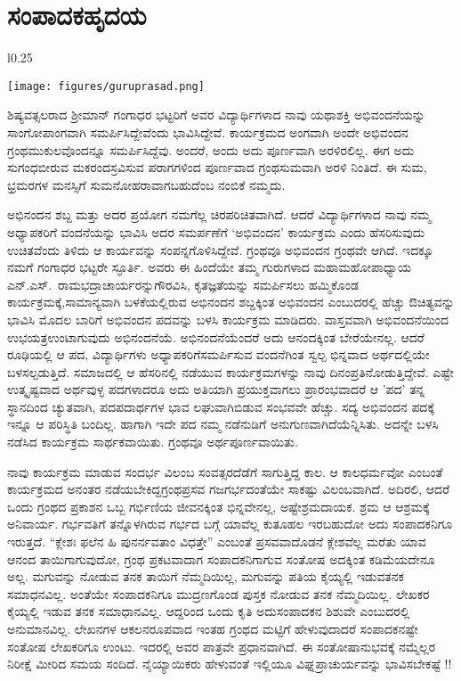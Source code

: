 {\fontsize{14}{16}\selectfont

\chapter{ಸಂಪಾದಕ\enginline{--}ಹೃದಯ}

\begin{wrapfigure}{l}{0.25\textwidth}
\centerline{\texttt{[image: figures/guruprasad.png]}}
\end{wrapfigure}
ಶಿಷ್ಯವತ್ಸಲರಾದ ಶ್ರೀಮಾನ್ ಗಂಗಾಧರ ಭಟ್ಟರಿಗೆ ಅವರ ವಿದ್ಯಾರ್ಥಿಗಳಾದ ನಾವು ಯಥಾಶಕ್ತಿ ಅಭಿವಂದನೆಯನ್ನು ಸಾಂಗೋಪಾಂಗವಾಗಿ ಸಮರ್ಪಿಸಿದ್ದೇವೆಂದು ಭಾವಿಸಿದ್ದೇವೆ. ಕಾರ್ಯಕ್ರಮದ ಅಂಗವಾಗಿ ಅಂದೇ ಅಭಿವಂದನ ಗ್ರಂಥ\-ಮುಕುಲವೊಂದನ್ನೂ ಸಮರ್ಪಿಸಿದ್ದೆವು. ಅಂದರೆ, ಅಂದು ಅದು ಪೂರ್ಣವಾಗಿ ಅರಳಿರಲಿಲ್ಲ. ಈಗ ಅದು ಸುಗಂಧ\break ಬೀರುವ ಮಕರಂದಸ್ರವಿಸುವ ಪರಾಗಗಳಿಂದ ಪೂರ್ಣವಾದ ಗ್ರಂಥಸುಮವಾಗಿ ಅರಳಿ ನಿಂತಿದೆ. ಈ ಸುಮ, ಭ್ರಮರಗಳ ಮನಸ್ಸಿಗೆ ಸುಮನೋಹರಾವಾಗಬಹುದೆಂಬ ನಂಬಿಕೆ ನಮ್ಮದು.

ಅಭಿನಂದನ ಶಬ್ದ ಮತ್ತು ಅದರ ಪ್ರಯೋಗ ನಮಗೆಲ್ಲ ಚಿರಪರಿಚಿತವಾಗಿದೆ. ಆದರೆ ವಿದ್ಯಾರ್ಥಿಗಳಾದ ನಾವು ನಮ್ಮ ಅಧ್ಯಾಪಕರಿಗೆ ವಂದನೆಯನ್ನು ಭಾವಿಸಿ ಅದರ ಸಮರ್ಪಣೆಗೆ ‘ಅಭಿವಂದನ’ ಕಾರ್ಯಕ್ರಮ ಎಂದು ಹೆಸರಿಸುವುದು ಉಚಿತವೆಂದು ತಿಳಿದು ಆ ಕಾರ್ಯವನ್ನು ಸಂಪನ್ನಗೊಳಿಸಿದ್ದೇವೆ. ಗ್ರಂಥವೂ ಅಭಿವಂದನ ಗ್ರಂಥವೇ ಆಗಿದೆ. ಇದಕ್ಕೂ ನಮಗೆ ಗಂಗಾಧರ ಭಟ್ಟರೇ ಸ್ಫೂರ್ತಿ. ಅವರು ಈ ಹಿಂದೆಯೇ ತಮ್ಮ ಗುರುಗಳಾದ ಮಹಾಮಹೋಪಾಧ್ಯಾಯ ಎನ್.ಎಸ್.\ ರಾಮಭದ್ರಾಚಾರ್ಯರನ್ನು\break ಗೌರವಿಸಿ, ಕೃತಜ್ಞತೆಯನ್ನು ಸಮರ್ಪಿಸಲು ಹಮ್ಮಿಕೊಂಡ ಕಾರ್ಯಕ್ರಮಕ್ಕೆ,\break ಸಾಮಾನ್ಯವಾಗಿ ಬಳಕೆಯಲ್ಲಿರುವ ಅಭಿನಂದನ ಶಬ್ದಕ್ಕಿಂತ ಅಭಿವಂದನ ಎಂಬುದರಲ್ಲಿ ಹೆಚ್ಚು ಔಚಿತ್ಯವನ್ನು ಭಾವಿಸಿ ಮೊದಲ ಬಾರಿಗೆ ಅಭಿವಂದನ ಪದವನ್ನು ಬಳಸಿ ಕಾರ್ಯಕ್ರಮ ಮಾಡಿದರು. ವಾಸ್ತವವಾಗಿ ಅಭಿವಂದನೆಯಿಂದ ಉಭಯತ್ರ\break ಉಂಟಾಗುವುದು ಅಭಿನಂದನೆಯೆ. ಅಭಿನಂದನೆಯೆಂದರೆ ಅದು ಆನಂದಕ್ಕಿಂತ ಬೇರೆಯೇನಲ್ಲ. ಆದರೆ ರೂಢಿಯಲ್ಲಿ ಆ ಪದ, ವಿದ್ಯಾರ್ಥಿಗಳು ಅಧ್ಯಾಪಕರಿಗೆ\break ಸಮರ್ಪಿಸುವ ವಂದನೆಗಿಂತ ಸ್ವಲ್ಪ ಭಿನ್ನವಾದ ಅರ್ಥದಲ್ಲಿಯೇ ಬಳಸಲ್ಪಡುತ್ತಿದೆ. ಸಮಾಜದಲ್ಲಿ ಆ ಹೆಸರಿನಲ್ಲಿ ನಡೆಯುವ ಕಾರ್ಯಕ್ರಮಗಳನ್ನು ನಾವು ದಿನಂಪ್ರತಿ\break ನೋಡುತ್ತಿದ್ದೇವೆ. ಎಷ್ಟೇ ಉತ್ಕೃಷ್ಟವಾದ ಅರ್ಥವುಳ್ಳ ಪದಗಳಾದರೂ ಅದು ಅತಿಯಾಗಿ ಪ್ರಯುಕ್ತವಾಗಲು ಪ್ರಾರಂಭವಾದರೆ ಆ ’ಪದ’ ತನ್ನ ಸ್ಥಾನದಿಂದ ಚ್ಯುತವಾಗಿ, ಪದ\enginline{-}ಪದಾರ್ಥಗಳ ಭಾವ ಲಘುವಾಗಿಬಿಡುವ ಸಂಭವವೇ ಹೆಚ್ಚು. ಸದ್ಯ ಅಭಿವಂದನ ಪದಕ್ಕೆ ಇನ್ನೂ ಆ ಪರಿಸ್ಥಿತಿ ಬಂದಿಲ್ಲ. ಹಾಗಾಗಿ ಇದೇ ಪದ ನಮ್ಮ ನಡೆನುಡಿಗೆ ಅನುಗುಣವಾಗಿದೆಯೆನ್ನಿಸಿತು. ಅದನ್ನೇ ಬಳಸಿ ನಡೆಸಿದ ಕಾರ್ಯಕ್ರಮ ಸಾರ್ಥಕವಾಯಿತು. ಗ್ರಂಥವೂ ಅರ್ಥಪೂರ್ಣವಾಯಿತು.

ನಾವು ಕಾರ್ಯಕ್ರಮ ಮಾಡುವ ಸಂದರ್ಭ ವಿಲಂಬ ಸಂವತ್ಸರದೆಡೆಗೆ \hbox{ಸಾಗುತ್ತಿದ್ದ} ಕಾಲ.  ಆ ಕಾಲಧರ್ಮವೋ ಎಂಬಂತೆ ಕಾರ್ಯಕ್ರಮದ ಅನಂತರ ನಡೆಯಬೇಕಿದ್ದ\break ಗ್ರಂಥಪ್ರಸವ ಗಜಗರ್ಭದಂತೆಯೇ ಸಾಕಷ್ಟು ವಿಲಂಬವಾಗಿದೆ. ಅದಿರಲಿ, ಆದರೆ ಒಂದು ಗ್ರಂಥದ ಪ್ರಕಾಶನ ಒಬ್ಬ ಗರ್ಭಿಣಿಯ ಜೀವನಕ್ಕಿಂತ ಭಿನ್ನವೇನಲ್ಲ, ಅಷ್ಟೇ\break ಶ್ರಮದಾಯಕ. ಶ್ರಮ ಆ ಆಶ್ರಮಕ್ಕೆ ಅನಿವಾರ್ಯ. ಗರ್ಭವತಿಗೆ ತನ್ನೊಳಗಿರುವ ಗರ್ಭದ ಬಗ್ಗೆ ಯಾವೆಲ್ಲ ಕುತೂಹಲ ಇರಬಹುದೋ ಅದು ಸಂಪಾದಕನಿಗೂ ಇರುತ್ತದೆ. “ಕ್ಲೇಶಃ ಫಲೆನ ಹಿ ಪುನರ್ನವತಾಂ ವಿಧತ್ತೇ” ಎಂಬಂತೆ ಪ್ರಸವವಾದೊಡನೆ ಕ್ಲೇಶವೆಲ್ಲ ಮರೆತು ಯಾವ ಆನಂದ ತಾಯಿಗಾಗುವುದೋ, ಗ್ರಂಥ ಪ್ರಕಟವಾದಾಗ ಸಂಪಾದಕನಿ\-ಗಾಗುವ ಸಂತೋಷ ಅದಕ್ಕಿಂತ ಕಡಿಮೆಯದೇನೂ ಅಲ್ಲ. ಮಗುವನ್ನು ನೋಡುವ ತನಕ ತಾಯಿಗೆ ನೆಮ್ಮದಿಯಿಲ್ಲ, ಮಗುವನ್ನು ಪತಿಯ ಕೈಯ್ಯಲ್ಲಿ ಇಡುವತನಕ ಸಮಾಧನ\-ವಿಲ್ಲ.  ಅಂತೆಯೇ ಸಂಪಾದಕನಿಗೂ ಮುದ್ರಣಗೊಂಡ ಪುಸ್ತಕ ನೋಡುವ ತನಕ ನೆಮ್ಮದಿಯಿಲ್ಲ. ಲೇಖಕರ ಕೈಯ್ಯಲ್ಲಿ ಇಡುವ ತನಕ ಸಮಾಧಾನವಿಲ್ಲ. ಆದ್ದರಿಂದ ಒಂದು ಕೃತಿ ಅದು\break ಸಂಪಾದಕನ ಶಿಶುವೇ ಎಂಬುದರಲ್ಲಿ ಅನುಮಾನವಿಲ್ಲ. ಲೇಖನಗಳ ಆಕಲನ\break ರೂಪವಾದ ಇಂತಹ ಗ್ರಂಥದ ಮಟ್ಟಿಗೆ ಹೇಳುವುದಾದರೆ ಸಂಪಾದಕನಷ್ಟೇ ಸಂತೋಷ ಲೇಖಕರಿಗೂ ಉಂಟು. ಇದರಲ್ಲಿ ಅವರ ಪಾತ್ರವೇ ಪ್ರಧಾನವಾಗಿದೆ. ಈ ಸಂತೋಷಾನು\-ಭವಕ್ಕೆ ನಮ್ಮೆಲ್ಲರ ನಿರೀಕ್ಷೆ ಮೀರಿದ ಸಮಯ ಸಂದಿದೆ. ನೈಯ್ಯಾಯಿಕರು ಹೇಳುವಂತೆ ಇಲ್ಲಿಯೂ ವಿಘ್ನಪ್ರಾಚುರ್ಯವನ್ನು ಭಾವಿಸಬೇಕಷ್ಟೆ !!

}

